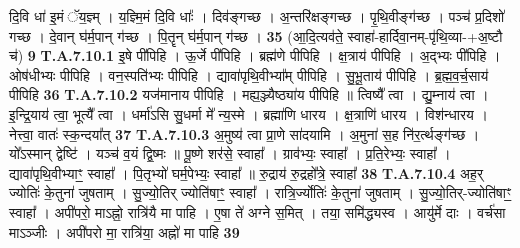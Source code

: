 \documentclass[17pt]{extarticle}
\begin{document}
                  दि॒वि धा॑ इ॒मं ॅय॒ज्ञ्म् । य॒ज्ञ्मि॒मं दि॒वि धाः᳚ । दिव॑ङ्गच्छ । अ॒न्तरि॑क्षङ्गच्छ । पृ॒थि॒वीङ्ग॑च्छ । पञ्च॑ प्र॒दिशो॑ गच्छ । दे॒वान् घ॑र्म॒पान् ग॑च्छ । पि॒तॄन् घ॑र्म॒पान् ग॑च्छ । \textbf{ 35} \newline
                  \newline
                                                        (आ॒दि॒त्यव॑ते॒ स्वाहा॑-हार्दिवा॒नम्-पृ॑थि॒व्या-+अ॒ष्टौ च॑) \textbf{9} \newline \newline
                                \textbf{ T.A.7.10.1} \newline
                  इ॒षे पी॑पिहि । ऊ॒र्जे पी॑पिहि । ब्रह्म॑णे पीपिहि । क्ष॒त्राय॑ पीपिहि । अ॒द्भ्यः पी॑पिहि । ओष॑धीभ्यः पीपिहि । वन॒स्पति॑भ्यः पीपिहि । द्यावा॑पृथि॒वीभ्या᳚म् पीपिहि । सु॒भू॒ताय॑ पीपिहि । ब्र॒ह्म॒व॒र्च॒साय॑ पीपिहि \textbf{ 36} \newline
                  \newline
                                                                  \textbf{ T.A.7.10.2} \newline
                  यज॑मानाय पीपिहि । मह्य॒ञ्ज्यैष्ठ्या॑य पीपिहि ॥ त्विष्यै᳚ त्वा । द्यु॒म्नाय॑ त्वा । इ॒न्द्रि॒याय॑ त्वा॒ भूत्यै᳚ त्वा । धर्मा॑ऽसि सु॒धर्मा मे᳚ न्य॒स्मे । ब्रह्मा॑णि धारय । क्ष॒त्राणि॑ धारय । विश॑न्धारय ।  नेत्त्वा॒ वातः॑ स्क॒न्दया᳚त् \textbf{ 37} \newline
                  \newline
                                                                  \textbf{ T.A.7.10.3} \newline
                  अ॒मुष्य॑ त्वा प्रा॒णे सा॑दयामि । अ॒मुना॑ स॒ह नि॑र॒र्त्थङ्ग॑च्छ । यो᳚ऽस्मान् द्वेष्टि॑ ।  यञ्च॑ व॒यं द्वि॒ष्मः ॥ पू॒ष्णे शर॑से॒ स्वाहा᳚ ।  ग्राव॑भ्यः॒ स्वाहा᳚ । प्र॒ति॒रेभ्यः॒ स्वाहा᳚ । द्यावा॑पृथि॒वीभ्याꣳ॒॒ स्वाहा᳚ ।  पि॒तृभ्यो॑ घर्म॒पेभ्यः॒ स्वाहा᳚ ॥  रु॒द्राय॑ रु॒द्रहो᳚त्रे॒ स्वाहा᳚ \textbf{ 38} \newline
                  \newline
                                                                  \textbf{ T.A.7.10.4} \newline
                  अह॒र् ज्योतिः॑ के॒तुना॑ जुषताम् । सु॒ज्यो॒तिर् ज्योति॑षाꣳ॒॒ स्वाहा᳚ । रात्रि॒र्ज्योतिः॑ के॒तुना॑ जुषताम् । सु॒ज्यो॒तिर्-ज्योति॑षाꣳ॒॒ स्वाहा᳚ । अपी॑परो॒ माऽह्नो॒ रात्रि॑यै मा पाहि । ए॒षा ते॑ अग्ने स॒मित् । तया॒ समि॑द्ध्यस्व । आयु॑र्मे दाः । वर्च॑सा माऽञ्जीः । अपी॑परो मा॒ रात्रि॑या॒ अह्नो॑ मा पाहि \textbf{ 39} \newline
\end{document}
